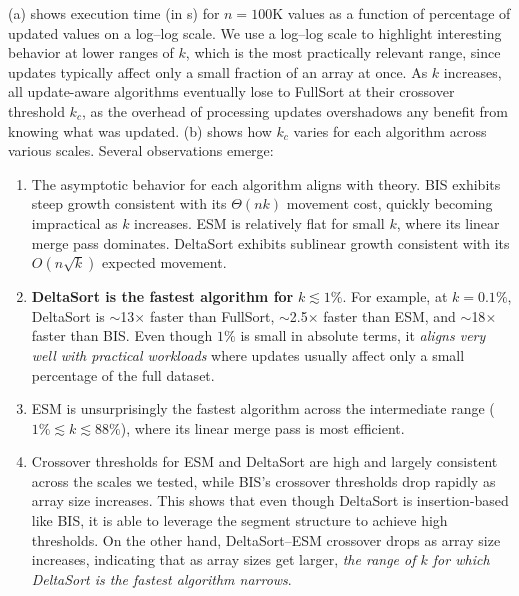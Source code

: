

(a) shows execution time (in \textmu s) for $n = 100$K values as a function of percentage of updated values on a log--log scale. We use a log--log scale to highlight interesting behavior at lower ranges of $k$, which is the most practically relevant range, since updates typically affect only a small fraction of an array at once. As $k$ increases, all update-aware algorithms eventually lose to FullSort at their crossover threshold $k_c$, as the overhead of processing updates overshadows any benefit from knowing what was updated. (b) shows how $k_c$ varies for each algorithm across various scales. Several observations emerge:

\begin{enumerate}
  \item The asymptotic behavior for each algorithm aligns with theory. BIS exhibits steep growth consistent with its $\Theta(nk)$ movement cost, quickly becoming impractical as $k$ increases. ESM is relatively flat for small $k$, where its linear merge pass dominates. DeltaSort exhibits sublinear growth consistent with its $O(n\sqrt{k})$ expected movement.

  \item \textbf{DeltaSort is the fastest algorithm for} $k \lesssim 1\%$. For example, at $k = 0.1\%$, DeltaSort is $\sim$13$\times$ faster than FullSort, $\sim$2.5$\times$ faster than ESM, and $\sim$18$\times$ faster than BIS. Even though $1\%$ is small in absolute terms, it \emph{aligns very well with practical workloads} where updates usually affect only a small percentage of the full dataset.

  \item ESM is unsurprisingly the fastest algorithm across the intermediate range ($1\% \lesssim k \lesssim 88\%$), where its linear merge pass is most efficient.
  
  \item Crossover thresholds for ESM and DeltaSort are high and largely consistent across the scales we tested, while BIS's crossover thresholds drop rapidly as array size increases. This shows that even though DeltaSort is insertion-based like BIS, it is able to leverage the segment structure to achieve high thresholds. On the other hand, DeltaSort--ESM crossover drops as array size increases, indicating that as array sizes get larger, \emph{the range of $k$ for which DeltaSort is the fastest algorithm narrows}.
\end{enumerate}

